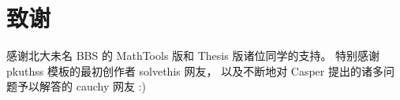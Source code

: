 \chapter{致谢}

感谢北大未名 BBS 的 MathTools 版和 Thesis 版诸位同学的支持。
特别感谢 pkuthss 模板的最初创作者 solvethis 网友，
以及不断地对 Casper 提出的诸多问题予以解答的 cauchy 网友 :)

